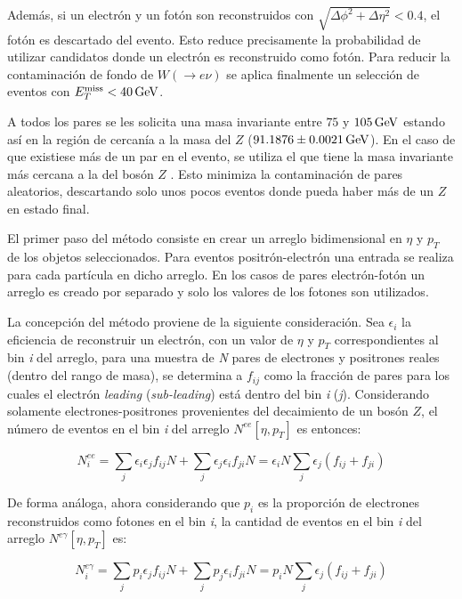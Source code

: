 Además, si un electrón y un fotón son reconstruidos con $\sqrt{\Delta\phi^{2}+\Delta\eta^{2}}<0.4$, el fotón es descartado del evento. Esto reduce precisamente la probabilidad de utilizar candidatos donde un electrón es reconstruido como fotón. Para reducir la contaminación de fondo de $W (\rightarrow e\nu)$ se aplica finalmente un selección de eventos con $E_{T}^{\text{miss}} < 40 \, \mathrm{GeV}$. 


A todos los pares se les solicita una masa invariante entre $75$ y $105 \, \mathrm{GeV}$  estando así en la región de cercanía a la masa del $Z$ ($91.1876 \pm 0.0021 \, \mathrm{GeV}$\cite{Olive:2016xmw}). En el caso de que existiese más de un par en el evento, se utiliza el que tiene la masa invariante más cercana a la del bosón $Z$ . Esto minimiza la contaminación de pares aleatorios, descartando solo unos pocos eventos donde pueda haber más de un $Z$ en estado final.


El primer paso del método consiste en crear un arreglo bidimensional en $\eta$ y $p_{T}$ de los objetos seleccionados. Para eventos positrón-electrón una entrada se realiza para cada partícula en dicho arreglo. En los casos de pares electrón-fotón un arreglo es creado por separado y solo los valores de los fotones son utilizados. 

La concepción del método proviene de la siguiente consideración. Sea $\epsilon_{i}$ la eficiencia de reconstruir un electrón, con un valor de $\eta$ y $p_{T}$ correspondientes al bin \textit{i} del arreglo, para una muestra de \textit{N} pares de electrones y positrones reales (dentro del rango de masa), se determina a $f_{ij}$ como la fracción de pares para los cuales el electrón \textit{leading} (\textit{sub-leading}) está dentro del bin \textit{i} (\textit{j}). Considerando solamente electrones-positrones provenientes del decaimiento de un bosón $Z$, el número de eventos en el bin \textit{i} del arreglo $N^{ee}[\eta , p_{T}]$ es entonces:

\begin{equation}
N_{i}^{ee} = \sum_{j}\epsilon_{i}\epsilon_{j}f_{ij}N + \sum_{j}\epsilon_{j}\epsilon_{i}f_{ji}N = \epsilon_{i}N\sum_{j}\epsilon_{j}(f_{ij}+f_{ji})
\end{equation}

De forma análoga, ahora considerando que $p_{i}$ es la proporción de electrones reconstruidos como fotones en el bin \textit{i}, la cantidad de eventos en el bin \textit{i} del arreglo $N^{e\gamma}[\eta , p_{T}]$ es:

\begin{equation}
N_{i}^{e\gamma} = \sum_{j}p_{i}\epsilon_{j}f_{ij}N + \sum_{j}p_{j}\epsilon_{i}f_{ji}N = p_{i}N\sum_{j}\epsilon_{j}(f_{ij}+f_{ji})
\end{equation}

